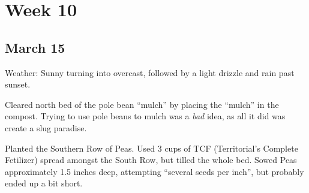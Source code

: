 \documentclass{article}
\begin{document}
\section*{Week 10}

\subsection*{March 15}
Weather: Sunny turning into overcast, followed by a light drizzle and rain past sunset.

Cleared north bed of the pole bean ``mulch'' by placing the ``mulch'' in the compost. Trying to use pole beans to mulch was a \textit{bad} idea, as all it did was create a slug paradise.

Planted the Southern Row of Peas. Used 3 cups of TCF (Territorial's Complete Fetilizer) spread amongst the South Row, but tilled the whole bed. Sowed Peas approximately 1.5 inches deep, attempting ``several seeds per inch'', but probably ended up a bit short.
\end{document}
